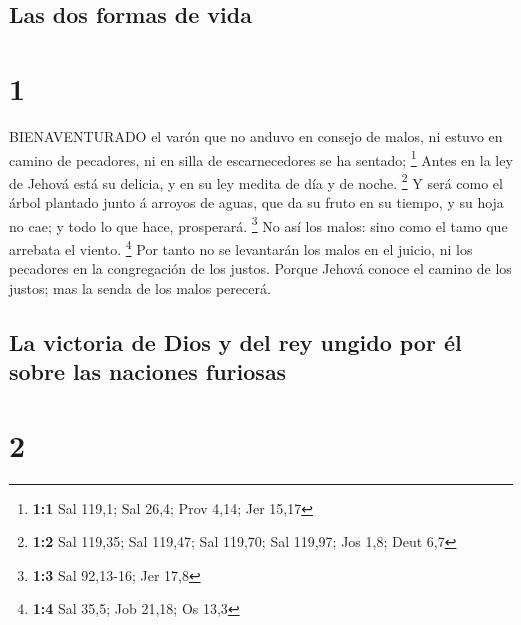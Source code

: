 \hypertarget{las-dos-formas-de-vida}{%
\subsection{Las dos formas de vida}\label{las-dos-formas-de-vida}}

\hypertarget{section}{%
\section{1}\label{section}}

 BIENAVENTURADO el varón que no anduvo en consejo de malos,
ni estuvo en camino de pecadores, ni en silla de escarnecedores se ha
sentado; \footnote{\textbf{1:1} Sal 119,1; Sal 26,4; Prov 4,14; Jer
  15,17}  Antes en la ley de Jehová está su delicia, y en su
ley medita de día y de noche. \footnote{\textbf{1:2} Sal 119,35; Sal
  119,47; Sal 119,70; Sal 119,97; Jos 1,8; Deut 6,7}  Y será
como el árbol plantado junto á arroyos de aguas, que da su fruto en su
tiempo, y su hoja no cae; y todo lo que hace, prosperará. \footnote{\textbf{1:3}
  Sal 92,13-16; Jer 17,8}  No así los malos: sino como el
tamo que arrebata el viento. \footnote{\textbf{1:4} Sal 35,5; Job 21,18;
  Os 13,3}  Por tanto no se levantarán los malos en el
juicio, ni los pecadores en la congregación de los justos. 
Porque Jehová conoce el camino de los justos; mas la senda de los malos
perecerá.

\hypertarget{la-victoria-de-dios-y-del-rey-ungido-por-uxe9l-sobre-las-naciones-furiosas}{%
\subsection{La victoria de Dios y del rey ungido por él sobre las
naciones
furiosas}\label{la-victoria-de-dios-y-del-rey-ungido-por-uxe9l-sobre-las-naciones-furiosas}}

\hypertarget{section-1}{%
\section{2}\label{section-1}}

